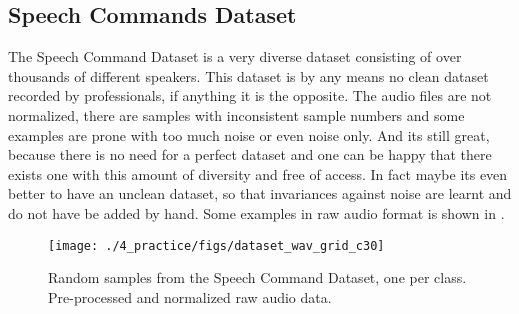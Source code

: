 
\subsection{Speech Commands Dataset}
The Speech Command Dataset \cite{warden2018} is a very diverse dataset consisting of over thousands of different speakers. This dataset is by any means no clean dataset recorded by professionals, if anything it is the opposite. 
The audio files are not normalized, there are samples with inconsistent sample numbers and some examples are prone with too much noise or even noise only.
And its still great, because there is no need for a perfect dataset and one can be happy that there exists one with this amount of diversity and free of access.
In fact maybe its even better to have an unclean dataset, so that invariances against noise are learnt and do not have be added by hand.
Some examples in raw audio format is shown in .
\begin{figure}[!ht]
  \centering
    \texttt{[image: ./4\_practice/figs/dataset\_wav\_grid\_c30]}
  \caption{Random samples from the Speech Command Dataset, one per class. Pre-processed and normalized raw audio data.}
  \label{fig:dataset_wav_grid_c30}
\end{figure}
\FloatBarrier
\noindent